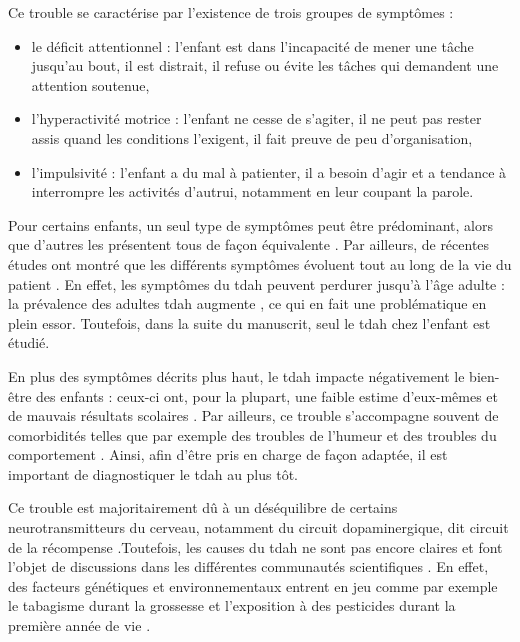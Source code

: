 Ce trouble se caractérise par l'existence de trois groupes de symptômes \citep{HAS} : 
\begin{itemize}
\item le déficit attentionnel : l'enfant est dans l'incapacité de mener une tâche jusqu'au bout, il est distrait, il refuse ou évite les tâches qui demandent
une attention soutenue,
\item l'hyperactivité motrice : l'enfant ne cesse de s'agiter, il ne peut pas rester assis quand les conditions l'exigent, il fait preuve de peu d'organisation,
\item l'impulsivité : l'enfant a du mal à patienter, il a besoin d'agir et a tendance à interrompre les activités d'autrui, notamment en leur coupant la parole.
\end{itemize}
Pour certains enfants, un seul type de symptômes peut être prédominant, alors que d'autres les présentent tous de façon équivalente \citep{DSM-5}. Par ailleurs, de récentes 
études ont montré que les différents symptômes évoluent tout au long de la vie du patient \citep{CFDCAP, Epstein2013}. En effet, les symptômes du \gls{tdah}
peuvent perdurer jusqu'à l'âge adulte \citep{Faraone2006} : la prévalence des adultes \gls{tdah} augmente \citep{Chung2019}, ce qui en fait une problématique
en plein essor. Toutefois, dans la suite du manuscrit, seul le \gls{tdah} chez l'enfant est étudié. 

En plus des symptômes décrits plus haut, le \gls{tdah} impacte négativement le bien-être des enfants : ceux-ci ont, pour la plupart, une faible estime d'eux-mêmes 
\citep{Shaw2005} et de mauvais résultats scolaires \citep{Barry2002}. Par ailleurs, ce trouble s'accompagne souvent de comorbidités telles que par exemple 
des troubles de l'humeur et des troubles du comportement \citep{Monastra2005}. Ainsi, afin d'être pris en charge de façon adaptée, il est important de diagnostiquer 
le \gls{tdah} au plus tôt. 

Ce trouble est majoritairement dû à un déséquilibre de certains neurotransmitteurs du cerveau, notamment du circuit dopaminergique, 
dit circuit de la récompense \citep{Daley2010, Punja2016}.Toutefois, les causes du \gls{tdah} ne sont pas encore claires et font l'objet de discussions
dans les différentes communautés scientifiques \citep{Galera2014}. En effet, des facteurs génétiques et environnementaux entrent en jeu comme par exemple le tabagisme durant la grossesse 
et l'exposition à des pesticides durant la première année de vie \citep{Galera2014}.

